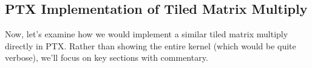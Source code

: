 \subsection{PTX Implementation of Tiled Matrix Multiply}

Now, let's examine how we would implement a similar tiled matrix multiply directly in PTX. Rather than showing the entire kernel (which would be quite verbose), we'll focus on key sections with commentary.

